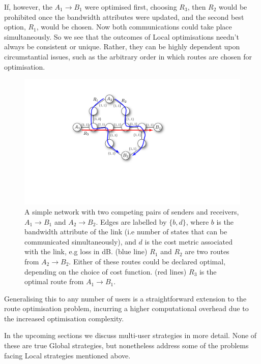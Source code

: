\documentclass[aps,rmp,twocolumn,amsmath,amssymb,nofootinbib,superscriptaddress,longbibliography,floatfix]{revtex4-1}
\begin{document}
If, however, the \mbox{$A_1\to B_1$} were optimised first, choosing $R_3$, then $R_2$ would be prohibited once the bandwidth attributes were updated, and the second best option, $R_1$, would be chosen. Now both communications could take place simultaneously. So we see that the outcomes of {\sc Local} optimisations needn't always be consistent or unique. Rather, they can be highly dependent upon circumstantial issues, such as the arbitrary order in which routes are chosen for optimisation.

\begin{figure}[!htb]
\includegraphics[width=\columnwidth]{conflict}
\caption{A simple network with two competing pairs of senders and receivers, \mbox{$A_1\to B_1$} and \mbox{$A_2\to B_2$}. Edges are labelled by \mbox{$\{b,d\}$}, where $b$ is the bandwidth attribute of the link (i.e number of states that can be communicated simultaneously), and $d$ is the cost metric associated with the link, e.g loss in dB. (blue line) $R_1$ and $R_2$ are two routes from $A_2\to B_2$. Either of these routes could be declared optimal, depending on the choice of cost function. (red lines) $R_3$ is the optimal route from \mbox{$A_1\to B_1$}.} \label{fig:conflict}
\end{figure}

Generalising this to any number of users is a straightforward extension to the route optimisation problem, incurring a higher computational overhead due to the increased optimisation complexity.

In the upcoming sections we discuss multi-user strategies in more detail. None of these are true {\sc Global} strategies, but nonetheless address some of the problems facing {\sc Local} strategies mentioned above.

%
%
\end{document}

